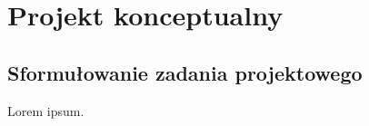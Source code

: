 \chapter{Projekt konceptualny}
\label{cha:konceptualny}

\section{Sformułowanie zadania projektowego}
\label{sec:sforzadproj}

Lorem ipsum.